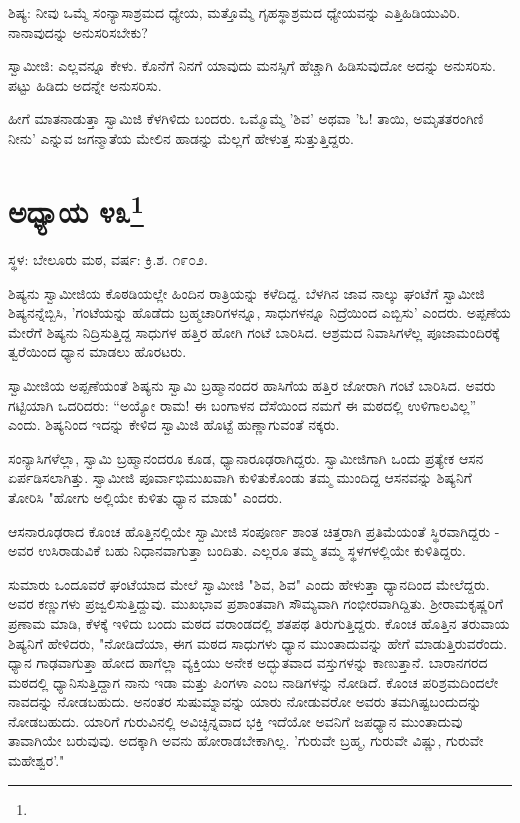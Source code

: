 ಶಿಷ್ಯ: ನೀವು ಒಮ್ಮೆ ಸಂನ್ಯಾಸಾಶ್ರಮದ ಧ್ಯೇಯ, ಮತ್ತೊಮ್ಮೆ ಗೃಹಸ್ಥಾಶ್ರಮದ ಧ್ಯೇಯವನ್ನು ಎತ್ತಿಹಿಡಿಯುವಿರಿ. ನಾನಾವುದನ್ನು ಅನುಸರಿಸಬೇಕು?

ಸ್ವಾಮೀಜಿ: ಎಲ್ಲವನ್ನೂ ಕೇಳು. ಕೊನೆಗೆ ನಿನಗೆ ಯಾವುದು ಮನಸ್ಸಿಗೆ ಹೆಚ್ಚಾಗಿ ಹಿಡಿಸುವುದೋ ಅದನ್ನು ಅನುಸರಿಸು. ಪಟ್ಟು ಹಿಡಿದು ಅದನ್ನೇ ಅನುಸರಿಸು.

ಹೀಗೆ ಮಾತನಾಡುತ್ತಾ ಸ್ವಾಮಿಜಿ ಕೆಳಗಿಳಿದು ಬಂದರು. ಒಮ್ಮೊಮ್ಮೆ 'ಶಿವ' ಅಥವಾ 'ಓ! ತಾಯಿ, ಅಮೃತತರಂಗಿಣಿ ನೀನು' ಎನ್ನುವ ಜಗನ್ಮಾತೆಯ ಮೇಲಿನ ಹಾಡನ್ನು ಮೆಲ್ಲಗೆ ಹೇಳುತ್ತ ಸುತ್ತುತ್ತಿದ್ದರು.

\newpage

\chapter[ಅಧ್ಯಾಯ ೪೩]{ಅಧ್ಯಾಯ ೪೩\protect\footnote{}}

\begin{center}
ಸ್ಥಳ: ಬೇಲೂರು ಮಠ, ವರ್ಷ: ಕ್ರಿ.ಶ. ೧೯೦೨.
\end{center}

ಶಿಷ್ಯನು ಸ್ವಾಮೀಜಿಯ ಕೊಠಡಿಯಲ್ಲೇ ಹಿಂದಿನ ರಾತ್ರಿಯನ್ನು ಕಳೆದಿದ್ದ. ಬೆಳಗಿನ ಜಾವ ನಾಲ್ಕು ಘಂಟೆಗೆ ಸ್ವಾಮೀಜಿ ಶಿಷ್ಯನನ್ನೆಬ್ಬಿಸಿ, 'ಗಂಟೆಯನ್ನು ಹೊಡೆದು ಬ್ರಹ್ಮಚಾರಿಗಳನ್ನೂ, ಸಾಧುಗಳನ್ನೂ ನಿದ್ರೆಯಿಂದ ಎಬ್ಬಿಸು' ಎಂದರು. ಅಪ್ಪಣೆಯ ಮೇರೆಗೆ ಶಿಷ್ಯನು ನಿದ್ರಿಸುತ್ತಿದ್ದ ಸಾಧುಗಳ ಹತ್ತಿರ ಹೋಗಿ ಗಂಟೆ ಬಾರಿಸಿದ. ಆಶ್ರಮದ ನಿವಾಸಿಗಳೆಲ್ಲ ಪೂಜಾಮಂದಿರಕ್ಕೆ ತ್ವರೆಯಿಂದ ಧ್ಯಾನ ಮಾಡಲು ಹೊರಟರು.

ಸ್ವಾಮೀಜಿಯ ಅಪ್ಪಣೆಯಂತೆ ಶಿಷ್ಯನು ಸ್ವಾಮಿ ಬ್ರಹ್ಮಾನಂದರ ಹಾಸಿಗೆಯ ಹತ್ತಿರ ಜೋರಾಗಿ ಗಂಟೆ ಬಾರಿಸಿದ. ಅವರು ಗಟ್ಟಿಯಾಗಿ ಒದರಿದರು: “ಅಯ್ಯೋ ರಾಮ! ಈ ಬಂಗಾಳನ ದೆಸೆಯಿಂದ ನಮಗೆ ಈ ಮಠದಲ್ಲಿ ಉಳಿಗಾಲವಿಲ್ಲ” ಎಂದು. ಶಿಷ್ಯನಿಂದ ಇದನ್ನು ಕೇಳಿದ ಸ್ವಾಮಿಜಿ ಹೊಟ್ಟೆ ಹುಣ್ಣಾಗುವಂತೆ ನಕ್ಕರು.

ಸಂನ್ಯಾಸಿಗಳೆಲ್ಲಾ, ಸ್ವಾಮಿ ಬ್ರಹ್ಮಾನಂದರೂ ಕೂಡ, ಧ್ಯಾನಾರೂಢರಾಗಿದ್ದರು. ಸ್ವಾಮೀಜಿಗಾಗಿ ಒಂದು ಪ್ರತ್ಯೇಕ ಆಸನ ಏರ್ಪಡಿಸಲಾಗಿತ್ತು. ಸ್ವಾಮೀಜಿ ಪೂರ್ವಾಭಿಮುಖವಾಗಿ ಕುಳಿತುಕೊಂಡು ತಮ್ಮ ಮುಂದಿದ್ದ ಆಸನವನ್ನು ಶಿಷ್ಯನಿಗೆ ತೋರಿಸಿ "ಹೋಗು ಅಲ್ಲಿಯೇ ಕುಳಿತು ಧ್ಯಾನ ಮಾಡು" ಎಂದರು.

ಆಸನಾರೂಢರಾದ ಕೊಂಚ ಹೊತ್ತಿನಲ್ಲಿಯೇ ಸ್ವಾಮೀಜಿ ಸಂಪೂರ್ಣ ಶಾಂತ ಚಿತ್ತರಾಗಿ ಪ್ರತಿಮೆಯಂತೆ ಸ್ಥಿರವಾಗಿದ್ದರು - ಅವರ ಉಸಿರಾಡುವಿಕೆ ಬಹು ನಿಧಾನವಾಗುತ್ತಾ ಬಂದಿತು. ಎಲ್ಲರೂ ತಮ್ಮ ತಮ್ಮ ಸ್ಥಳಗಳಲ್ಲಿಯೇ ಕುಳಿತಿದ್ದರು.

ಸುಮಾರು ಒಂದೂವರೆ ಘಂಟೆಯಾದ ಮೇಲೆ ಸ್ವಾಮೀಜಿ "ಶಿವ, ಶಿವ" ಎಂದು ಹೇಳುತ್ತಾ ಧ್ಯಾನದಿಂದ ಮೇಲೆದ್ದರು. ಅವರ ಕಣ್ಣುಗಳು ಪ್ರಜ್ವಲಿಸುತ್ತಿದ್ದುವು. ಮುಖಭಾವ ಪ್ರಶಾಂತವಾಗಿ ಸೌಮ್ಯವಾಗಿ ಗಂಭೀರವಾಗಿದ್ದಿತು. ಶ‍್ರೀರಾಮಕೃಷ್ಣರಿಗೆ ಪ್ರಣಾಮ ಮಾಡಿ, ಕೆಳಕ್ಕೆ ಇಳಿದು ಬಂದು ಮಠದ ವರಾಂಡದಲ್ಲಿ ಶತಪಥ ತಿರುಗುತ್ತಿದ್ದರು. ಕೊಂಚ ಹೊತ್ತಿನ ತರುವಾಯ ಶಿಷ್ಯನಿಗೆ ಹೇಳಿದರು, "ನೋಡಿದೆಯಾ, ಈಗ ಮಠದ ಸಾಧುಗಳು ಧ್ಯಾನ ಮುಂತಾದುವನ್ನು ಹೇಗೆ ಮಾಡುತ್ತಿರುವರೆಂದು. ಧ್ಯಾನ ಗಾಢವಾಗುತ್ತಾ ಹೋದ ಹಾಗೆಲ್ಲಾ ವ್ಯಕ್ತಿಯು ಅನೇಕ ಅದ್ಭುತವಾದ ವಸ್ತುಗಳನ್ನು ಕಾಣುತ್ತಾನೆ. ಬಾರಾನಗರದ ಮಠದಲ್ಲಿ ಧ್ಯಾನಿಸುತ್ತಿದ್ದಾಗ ನಾನು ಇಡಾ ಮತ್ತು ಪಿಂಗಳಾ ಎಂಬ ನಾಡಿಗಳನ್ನು ನೋಡಿದೆ. ಕೊಂಚ ಪರಿಶ್ರಮದಿಂದಲೇ ನಾವದನ್ನು ನೋಡಬಹುದು. ಅನಂತರ ಸುಷುಮ್ನಾವನ್ನು ಯಾರು ನೋಡುವರೋ ಅವರು ತಮಗಿಷ್ಟಬಂದುದನ್ನು ನೋಡಬಹುದು. ಯಾರಿಗೆ ಗುರುವಿನಲ್ಲಿ ಅವಿಚ್ಛಿನ್ನವಾದ ಭಕ್ತಿ ಇದೆಯೋ ಅವನಿಗೆ ಜಪಧ್ಯಾನ ಮುಂತಾದುವು ತಾವಾಗಿಯೇ ಬರುವುವು. ಅದಕ್ಕಾಗಿ ಅವನು ಹೋರಾಡಬೇಕಾಗಿಲ್ಲ. 'ಗುರುವೇ ಬ್ರಹ್ಮ, ಗುರುವೇ ವಿಷ್ಣು, ಗುರುವೇ ಮಹೇಶ್ವರ'."

